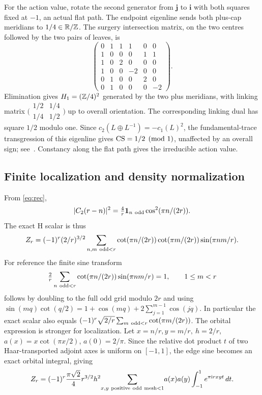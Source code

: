 For the action value, rotate the second generator from \(\mathbf j\) to \(\mathbf i\) with both squares fixed at \(-1\), an actual flat path. The endpoint eigenline sends both plus-cap meridians to \(1/4\in\mathbb R/\mathbb Z\). The surgery intersection matrix, on the two centres followed by the two pairs of leaves, is
\[
 \begin{pmatrix}0&1&1&1&0&0\\1&0&0&0&1&1\\1&0&2&0&0&0\\
 1&0&0&-2&0&0\\0&1&0&0&2&0\\0&1&0&0&0&-2\end{pmatrix}.
\]
Elimination gives \(H_1=(\mathbb Z/4)^2\) generated by the two plus meridians, with linking matrix \(\bigl(\begin{smallmatrix}1/2&1/4\\1/4&1/2\end{smallmatrix}\bigr)\) up to overall orientation. The corresponding linking dual has square \(1/2\) modulo one. Since \(c_2(L\oplus L^{-1})=-c_1(L)^2\), the fundamental-trace transgression of this eigenline gives \(\operatorname{CS}=1/2\pmod1\), unaffected by an overall sign; see~\cite{Auckly}. Constancy along the flat path gives the irreducible action value.

\subsection{Finite localization and density normalization}

From \eqref{eq:rec},
\[
 |C_2(r-n)|^2=\tfrac4r{\bf1}_{n\ {\rm odd}}\cos^2(\pi n/(2r)).
\]
The exact H scalar is thus
\[
 Z_r=(-1)^r(2/r)^{3/2}\sum_{n,m\ {\rm odd}<r}
      \cot(\pi n/(2r))\cot(\pi m/(2r))\sin(\pi nm/r).
\]
For reference the finite sine transform
\[
 \tfrac2r\sum_{n\ {\rm odd}<r}\cot(\pi n/(2r))\sin(\pi nm/r)=1,\qquad 1\le m<r
\]
follows by doubling to the full odd grid modulo \(2r\) and using
\(\sin(mq)\cot(q/2)=1+\cos(mq)+2\sum_{j=1}^{m-1}\cos(jq)\). In particular the exact scalar also equals \((-1)^r\sqrt{2/r}\sum_{m\ {\rm odd}<r}\cot(\pi m/(2r))\). The orbital expression is stronger for localization. Let \(x=n/r,y=m/r,\ h=2/r\), \(a(x)=x\cot(\pi x/2)\), \(a(0)=2/\pi\). Since the relative dot product \(t\) of two Haar-transported adjoint axes is uniform on \([-1,1]\), the edge sine becomes an exact orbital integral, giving
\begin{equation}\label{eq:Horbit}
 Z_r=(-1)^r\frac{\pi\sqrt2}{4}r^{3/2}
 h^2\!\sum_{x,y\ {\rm positive\ odd\ mesh}<1}\!
 a(x)a(y)\int_{-1}^{1}e^{\pi\mathrm i r xyt}\,dt.
\end{equation}

